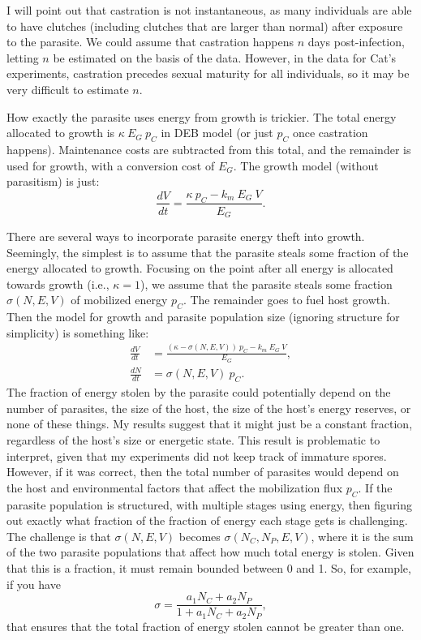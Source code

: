 \documentclass[12pt,reqno,final,pdftex]{amsart}\usepackage[]{graphicx}\usepackage[]{color}
\theoremstyle{plain}
\numberwithin{equation}{part}
\begin{document}
I will point out that castration is not instantaneous, as many individuals are able to have clutches (including clutches that are larger than normal) after exposure to the parasite.
We could assume that castration happens $n$ days post-infection, letting $n$ be estimated on the basis of the data.
However, in the data for Cat's experiments, castration precedes sexual maturity for all individuals, so it may be very difficult to estimate $n$.

How exactly the parasite uses energy from growth is trickier.
The total energy allocated to growth is $\kappa~E_G~p_C$ in DEB model (or just $p_C$ once castration happens).
Maintenance costs are subtracted from this total, and the remainder is used for growth, with a conversion cost of $E_G$.
The growth model (without parasitism) is just:
\begin{equation}
\frac{dV}{dt} = \frac{\kappa~p_C - k_m~E_G~V}{E_G}.
\end{equation}

There are several ways to incorporate parasite energy theft into growth.
Seemingly, the simplest is to assume that the parasite steals some fraction of the energy allocated to growth.
Focusing on the point after all energy is allocated towards growth (i.e., $\kappa=1$), we assume that the parasite steals some fraction $\sigma(N,E,V)$ of mobilized energy $p_C$. The remainder goes to fuel host growth. Then the model for growth and parasite population size (ignoring structure for simplicity) is something like:
\begin{align}
\frac{dV}{dt} &= \frac{(\kappa-\sigma(N,E,V))~p_C - k_m~E_G~V}{E_G}, \\
\frac{dN}{dt} &= \sigma(N,E,V)~p_C.
\end{align}
The fraction of energy stolen by the parasite could potentially depend on the number of parasites, the size of the host, the size of the host's energy reserves, or none of these things.
My results suggest that it might just be a constant fraction, regardless of the host's size or energetic state.
This result is problematic to interpret, given that my experiments did not keep track of immature spores.
However, if it was correct, then the total number of parasites would depend on the host and environmental factors that affect the mobilization flux $p_C$.
If the parasite population is structured, with multiple stages using energy, then figuring out exactly what fraction of the fraction of energy each stage gets is challenging.
The challenge is that $\sigma(N,E,V)$ becomes $\sigma(N_C, N_P, E, V)$, where it is the sum of the two parasite populations that affect how much total energy is stolen.
Given that this is a fraction, it must remain bounded between 0 and 1.
So, for example, if you have
\begin{equation}
\sigma = \frac{a_1 N_C + a_2 N_P}{1 + a_1 N_C + a_2 N_P},
\end{equation}
that ensures that the total fraction of energy stolen cannot be greater than one.
\end{document}
